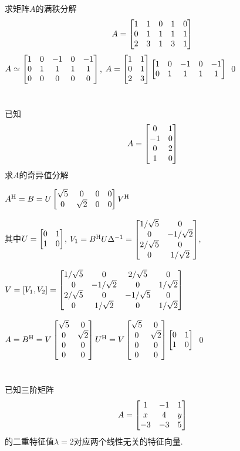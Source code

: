 \documentclass{matrix-homework}
\begin{document}

\section{}
求矩阵$A$的满秩分解
$$A=\begin{bmatrix}1&1&0&1&0\\ 0&1&1&1&1\\ 2&3&1&3&1\end{bmatrix}$$
\answer
$A\simeq\begin{bmatrix}1&0&-1&0&-1\\ 0&1&1&1&1\\ 0&0&0&0&0\end{bmatrix}$, $A=\begin{bmatrix}1&1 \\ 0&1 \\ 2&3\end{bmatrix}\begin{bmatrix}1&0&-1&0&-1\\ 0&1&1&1&1\end{bmatrix}$
\qed


\section{}
已知$$A=\begin{bmatrix}0&1\\ -1&0\\ 0&2\\ 1&0\end{bmatrix}$$求$A$的奇异值分解

\answer
$A^{\mathrm{H}}=B=U\begin{bmatrix}\sqrt{5}&0&0&0\\ 0&\sqrt{2}&0&0\end{bmatrix}V^{\mathrm{H}}$

其中$U=\begin{bmatrix}0&1\\1&0\end{bmatrix}$, $V_1=B^{\mathrm{H}} U\Delta^{-1}=\begin{bmatrix}1/\sqrt{5}&0\\ 0&-1/\sqrt{2} \\ 2/\sqrt{5}&0 \\ 0&1/\sqrt{2}\end{bmatrix}$,

$V=[V_1, V_2]=\begin{bmatrix}1/\sqrt{5}&0&2/\sqrt{5}&0\\ 0&-1/\sqrt{2}&0&1/\sqrt{2} \\ 2/\sqrt{5}&0&-1/\sqrt{5}&0 \\ 0&1/\sqrt{2}&0&1/\sqrt{2}\end{bmatrix}$

$A=B^{\mathrm{H}}=V\begin{bmatrix}\sqrt{5}&0 \\ 0&\sqrt{2} \\ 0&0 \\ 0&0\end{bmatrix}U^{\mathrm{H}} = V\begin{bmatrix}\sqrt{5}&0 \\ 0&\sqrt{2} \\ 0&0 \\ 0&0\end{bmatrix}\begin{bmatrix}0&1\\1&0\end{bmatrix}$
\qed


\section{}
已知三阶矩阵$$A=\begin{bmatrix}1&-1&1\\x&4&y\\-3&-3&5\end{bmatrix}$$的二重特征值$\lambda=2$对应两个线性无关的特征向量.
\end{document}
